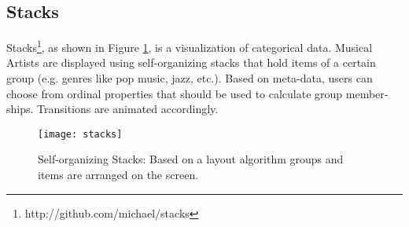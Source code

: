 \begin{english}
\subsection{Stacks}

Stacks\footnote{http://github.com/michael/stacks}, as shown in Figure \ref{fig:stacks}, is a visualization of categorical data. Musical Artists are displayed using self-organizing stacks that hold items of a certain group (e.g. genres like pop music, jazz, etc.). Based on meta-data, users can choose from ordinal properties that should be used to calculate group memberships. Transitions are animated accordingly. 

\begin{figure}
\centering
\texttt{[image: stacks]}
\caption{Self-organizing Stacks: Based on a layout algorithm groups and items are arranged on the screen.}
\label{fig:stacks}
\end{figure}

\end{english}